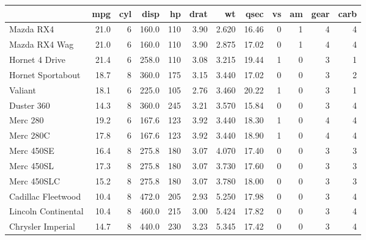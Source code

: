 \documentclass[
]{book}
\newenvironment{Shaded}{\begin{snugshade}}{\end{snugshade}}
\newcommand{\DecValTok}[1]{\textcolor[rgb]{0.00,0.00,0.81}{#1}}
\newcommand{\FunctionTok}[1]{\textcolor[rgb]{0.00,0.00,0.00}{#1}}
\newcommand{\NormalTok}[1]{#1}
\newcommand{\OtherTok}[1]{\textcolor[rgb]{0.56,0.35,0.01}{#1}}
\newcommand{\SpecialCharTok}[1]{\textcolor[rgb]{0.00,0.00,0.00}{#1}}
\theoremstyle{definition}
\theoremstyle{definition}
\theoremstyle{definition}
\theoremstyle{definition}
\theoremstyle{remark}
\begin{document}
\begin{Shaded}
\end{Shaded}

\begin{tabular}{l|r|r|r|r|r|r|r|r|r|r|r}
\hline
  & mpg & cyl & disp & hp & drat & wt & qsec & vs & am & gear & carb\\
\hline
Mazda RX4 & 21.0 & 6 & 160.0 & 110 & 3.90 & 2.620 & 16.46 & 0 & 1 & 4 & 4\\
\hline
Mazda RX4 Wag & 21.0 & 6 & 160.0 & 110 & 3.90 & 2.875 & 17.02 & 0 & 1 & 4 & 4\\
\hline
Hornet 4 Drive & 21.4 & 6 & 258.0 & 110 & 3.08 & 3.215 & 19.44 & 1 & 0 & 3 & 1\\
\hline
Hornet Sportabout & 18.7 & 8 & 360.0 & 175 & 3.15 & 3.440 & 17.02 & 0 & 0 & 3 & 2\\
\hline
Valiant & 18.1 & 6 & 225.0 & 105 & 2.76 & 3.460 & 20.22 & 1 & 0 & 3 & 1\\
\hline
Duster 360 & 14.3 & 8 & 360.0 & 245 & 3.21 & 3.570 & 15.84 & 0 & 0 & 3 & 4\\
\hline
Merc 280 & 19.2 & 6 & 167.6 & 123 & 3.92 & 3.440 & 18.30 & 1 & 0 & 4 & 4\\
\hline
Merc 280C & 17.8 & 6 & 167.6 & 123 & 3.92 & 3.440 & 18.90 & 1 & 0 & 4 & 4\\
\hline
Merc 450SE & 16.4 & 8 & 275.8 & 180 & 3.07 & 4.070 & 17.40 & 0 & 0 & 3 & 3\\
\hline
Merc 450SL & 17.3 & 8 & 275.8 & 180 & 3.07 & 3.730 & 17.60 & 0 & 0 & 3 & 3\\
\hline
Merc 450SLC & 15.2 & 8 & 275.8 & 180 & 3.07 & 3.780 & 18.00 & 0 & 0 & 3 & 3\\
\hline
Cadillac Fleetwood & 10.4 & 8 & 472.0 & 205 & 2.93 & 5.250 & 17.98 & 0 & 0 & 3 & 4\\
\hline
Lincoln Continental & 10.4 & 8 & 460.0 & 215 & 3.00 & 5.424 & 17.82 & 0 & 0 & 3 & 4\\
\hline
Chrysler Imperial & 14.7 & 8 & 440.0 & 230 & 3.23 & 5.345 & 17.42 & 0 & 0 & 3 & 4\\
\hline

\end{tabular}
\end{document}

